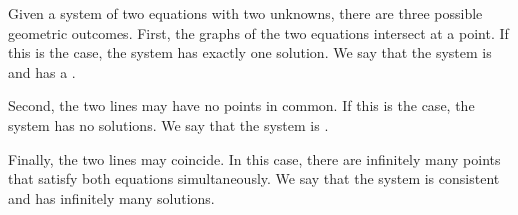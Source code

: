 \documentclass{ximera}
\begin{document}
\begin{center}
\end{center}

Given a system of two equations with two unknowns, there are three possible geometric outcomes.  First, the graphs of the two equations intersect at a point.  If this is the case, the system has exactly one solution. We say that the system is  and has a .  

\begin{center}
\end{center}
Second, the two lines may have no points in common.  If this is the case, the system has no solutions.  We say that the system is .  
\begin{center}
\end{center}
Finally, the two lines may coincide.  In this case, there are infinitely many points that satisfy both equations simultaneously.  We say that the system is consistent and has infinitely many solutions.
\begin{center}
\end{center}
\end{document}
